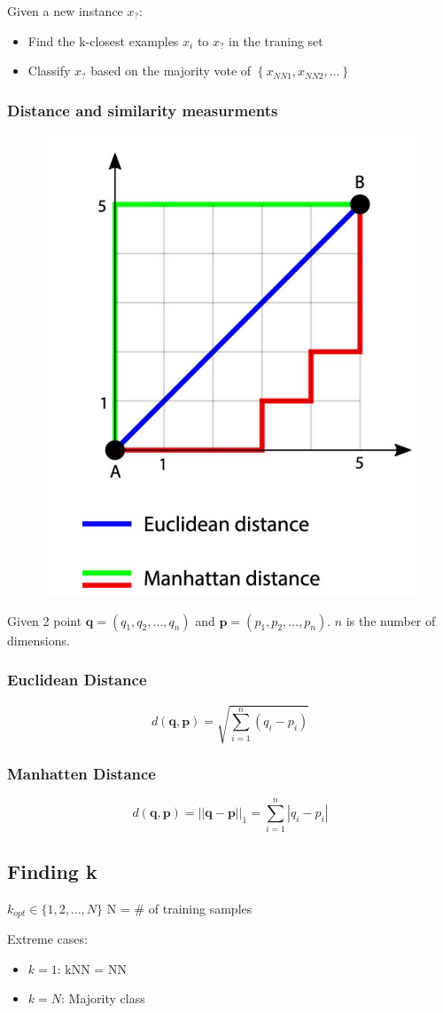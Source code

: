 Given a new instance \(x_?\):
\begin{itemize}
    \item Find the k-closest examples \(x_i\) to \(x_?\) in the traning set
    \item Classify \(x_?\) based on the majority vote of \(\left\{x_{NN1},x_{NN2},\dots\right\}\)
\end{itemize}
\subsubsection{Distance and similarity measurments}
\begin{figure}[!h]
    \includegraphics[width = 0.4\columnwidth]{figures/02/distances.png}
\end{figure}
Given 2 point \(\mathbf{q} = (q_1,q_2,\dots,q_n)\) and \(\mathbf{p}= (p_1,p_2,\dots,p_n)\).
\(n\) is the number of dimensions.
\subsubsection*{Euclidean Distance}
\[
d(\mathbf{q},\mathbf{p}) = \sqrt{\sum_{i=1}^{n}(q_i- p_i)}
\]
\subsubsection*{Manhatten Distance}
\[
    d(\mathbf{q},\mathbf{p}) = ||\mathbf{q}-\mathbf{p}||_1 = \sum_{i= 1}^{n}|q_i-p_i|
\]

\subsection{Finding k}
\(k_{opt} \in \{1,2,\dots,N\}\) N = \# of training samples

Extreme cases:
\begin{itemize}
    \item \(k = 1\): kNN = NN
    \item \(k = N\): Majority class
\end{itemize}
